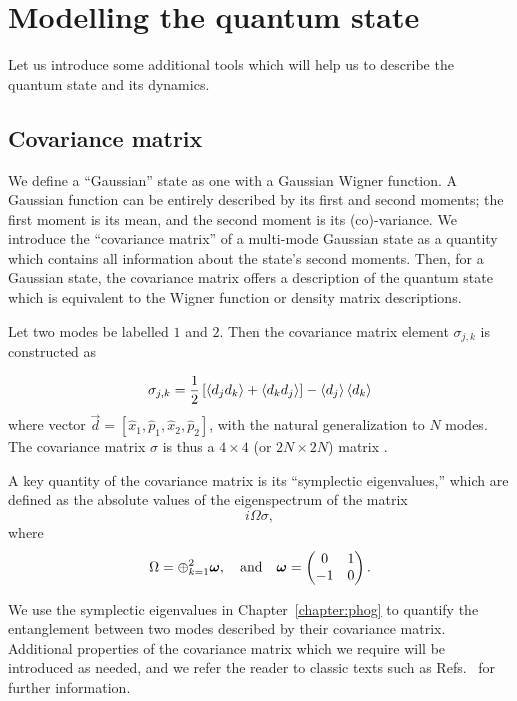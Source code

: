 \FloatBarrier
\section{Modelling the quantum state}
Let us introduce some additional tools which will help us to describe the quantum state and its dynamics.


\FloatBarrier
\subsection{Covariance matrix}
We define a ``Gaussian'' state as one with a Gaussian Wigner function. A Gaussian function can be entirely described by its first and second moments; the first moment is its mean, and the second moment is its (co)-variance. We introduce the ``covariance matrix'' of a multi-mode Gaussian state as a quantity which contains all information about the state's second moments. Then, for a Gaussian state, the covariance matrix offers a description of the quantum state which is equivalent to the Wigner function or density matrix descriptions. 


Let two modes be labelled $1$ and $2$. Then the covariance matrix element $\sigma_{j, k}$ is constructed as

\begin{equation}\label{eqn:intro_covariancematrix}
\sigma_{j, k} = \frac{1}{2} \left[ \ev{d_j d_k} + \ev{d_k d_j}\right] - \ev{d_j} \ev{d_k}
\end{equation}
where vector $\overrightarrow{d} = \left[\hat{x}_1, \hat{p}_1, \hat{x}_2, \hat{p}_2 \right]$, with the natural generalization to $N$ modes. The covariance matrix $\sigma$ is thus a $4 \times 4$ (or $2 N \times 2 N$) matrix . 

A key quantity of the covariance matrix is its ``symplectic eigenvalues,'' which are defined as the absolute values of the eigenspectrum of the matrix
\begin{equation}
i \Omega \sigma,
\end{equation}
where 
\begin{equation}
\Omega = \oplus_{k=1}^2 \bm{\omega}, \qq{and} \bm{\omega} = \pmqty{0 & 1 \\ -1 & 0}.
\end{equation}

\noindent We use the symplectic eigenvalues in Chapter~\ref{chapter:phog} to quantify the entanglement between two modes described by their covariance matrix. Additional properties of the covariance matrix which we require will be introduced as needed, and we refer the reader to classic texts such as Refs.~\cite{Weedbrook2012, Serafini2017} for further information.


